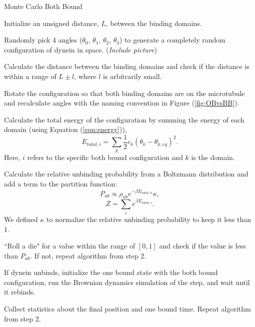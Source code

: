 \begin{algorithm}[H]
	\caption{Monte Carlo Both Bound}
	\label{alg:MonteCarlo}

	\begin{alg}
	\item Initialize an unsigned distance, $L$, between the binding domains.
	
	\item Randomly pick 4 angles ($\theta_0$, $\theta_1$, $\theta_2$, $\theta_3$) to generate a completely random configuration of dynein in space. (\textit{Include picture})
	
	\item Calculate the distance between the binding domains and check if the distance is within a range of $L\pm l$, where $l$ is arbitrarily small.
	
	\item Rotate the configuration so that both binding domains are on the microtubule and recalculate angles with the naming convention in Figure (\ref{fig:OBvsBB}).
	
	\item Calculate the total energy of the configuration by summing the energy of each domain (using Equation (\ref{eqn:energy})),
	\begin{equation}
		E_{total, i}=\sum_{k}\frac{1}{2}c_k(\theta_k-\theta_{k,eq})^2.
	\end{equation}
	Here, $i$ refers to the specific both bound configuration and $k$ is the domain.	
	
	\item Calculate the relative unbinding probability from a Boltzmann distribution and add a term to the partition function:
	\begin{equation}
		P_{ub} \propto \rho_{ub}e^{-\beta E_{total, n}}\kappa,
	\end{equation}
	\begin{equation}
		Z=\sum_{i}e^{\beta E_{total, i}}.
	\end{equation}
	We defined $\kappa$ to normalize the relative unbinding probability to keep it less than 1. 
	
	\item ``Roll a die" for a value within the range of $[0,1]$ and check if the value is less than $P_{ub}$. If not, repeat algorithm from step 2.
	
	\item If dynein unbinds, initialize the one bound state with the both bound configuration, run the Brownian dynamics simulation of the step, and wait until it rebinds.
	
	\item Collect statistics about the final position and one bound time. Repeat algorithm from step 2. 
	
	\end{alg}

\end{algorithm}

